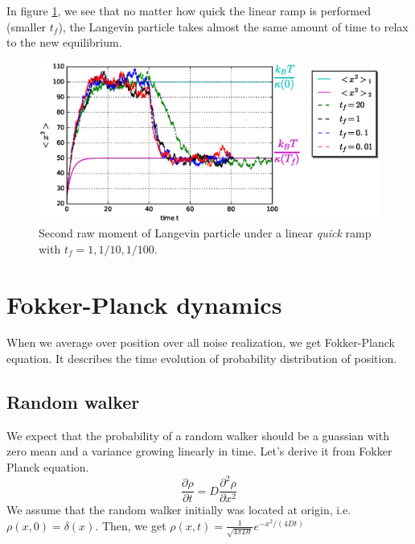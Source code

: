 \documentclass[11pt,a4paper]{article}
\begin{document}
In figure \ref{sigma_ramp2b}, we see that no matter how quick the linear ramp is performed (smaller $t_f$), the Langevin particle takes almost the same amount of time to relax to the new equilibrium. 
\begin{figure}[!htbp]
\centering
\includegraphics[scale=0.67]{ramp_sigma_gamma_10_second.eps}
\caption{ Second raw moment of Langevin particle under a linear \textit{quick} ramp with $t_f=1,1/10,1/100$. }
\label{sigma_ramp2b}
\end{figure}



\section{Fokker-Planck dynamics}
When we average over position over all noise realization, we get Fokker-Planck equation. It describes the time evolution of  probability distribution of position. 
\subsection*{Random walker}
We expect that the probability of a random walker should be a guassian with zero mean and a variance growing linearly in time. Let's derive it from Fokker Planck equation. 
\begin{equation}
\dfrac{\partial \rho}{\partial t} =  D \dfrac{\partial^2 \rho}{\partial x^2} 
\end{equation}
We assume that the random walker initially was located at origin, i.e. $\rho(x,0) = \delta(x)$. Then, we get $\rho (x,t) = \frac{1}{\sqrt{4  \pi D  t}}e^{-{x^2}/({4 Dt})}$ 
\end{document}
